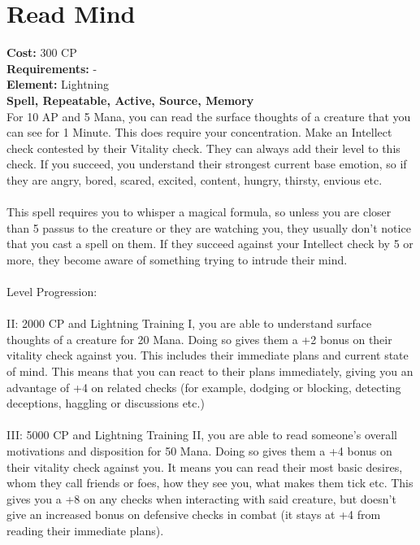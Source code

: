 \section{Read Mind}
\textbf{Cost:} 300 CP\\
\textbf{Requirements:} -\\
\textbf{Element:} Lightning\\
\textbf{Spell, Repeatable, Active, Source, Memory}\\
For 10 AP and 5 Mana, you can read the surface thoughts of a creature that you can see for 1 Minute. This does require your concentration. Make an Intellect check contested by their Vitality check. They can always add their level to this check. If you succeed, you understand their strongest current base emotion, so if they are angry, bored, scared, excited, content, hungry, thirsty, envious etc.\\
\\
This spell requires you to whisper a magical formula, so unless you are closer than 5 passus to the creature or they are watching you, they usually don't notice that you cast a spell on them. If they succeed against your Intellect check by 5 or more, they become aware of something trying to intrude their mind.\\
\\
Level Progression:\\
\\
II: 2000 CP and Lightning Training I, you are able to understand surface thoughts of a creature for 20 Mana. Doing so gives them a +2 bonus on their vitality check against you. This includes their immediate plans and current state of mind. This means that you can react to their plans immediately, giving you an advantage of +4 on related checks (for example, dodging or blocking, detecting deceptions, haggling or discussions etc.)\\
\\
III: 5000 CP and Lightning Training II, you are able to read someone's overall motivations and disposition for 50 Mana. Doing so gives them a +4 bonus on their vitality check against you. It means you can read their most basic desires, whom they call friends or foes, how they see you, what makes them tick etc. This gives you a +8 on any checks when interacting with said creature, but doesn't give an increased bonus on defensive checks in combat (it stays at +4 from reading their immediate plans).\\
